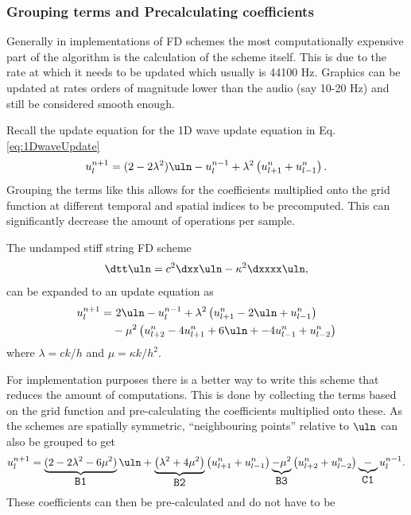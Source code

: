 \pagebreak
\subsubsection{Grouping terms and Precalculating coefficients}
Generally in implementations of FD schemes the most computationally expensive part of the algorithm is the calculation of the scheme itself. This is due to the rate at which it needs to be updated which usually is 44100 Hz. Graphics can be updated at rates orders of magnitude lower than the audio (say 10-20 Hz) and still be considered smooth enough.

Recall the update equation for the 1D wave update equation in Eq. \eqref{eq:1DwaveUpdate}
\begin{equation*}
    u_l^{n+1} = (2 - 2 \lambda^2) \uln - u_l^{n-1} + \lambda^2\left(u_{l+1}^n + u_{l-1}^n\right).
\end{equation*}
Grouping the terms like this allows for the coefficients multiplied onto the grid function at different temporal and spatial indices to be precomputed. This can significantly decrease the amount of operations per sample.

The undamped stiff string FD scheme%
\begin{equation}
    \dtt \uln = c^2 \dxx \uln - \kappa^2 \dxxxx \uln,
\end{equation}
can be expanded to an update equation as
\begin{equation}
    \begin{aligned}
        u_l^{n+1} = &\ 2\uln - u_l^{n-1} + \lambda^2 \left(u_{l+1}^n - 2\uln + u_{l-1}^n\right)\\
        & - \mu^2 \left(u_{l+2}^n - 4u_{l+1}^n + 6\uln + -4u_{l-1}^n + u_{l-2}^n\right)
    \end{aligned}
\end{equation}
where $\lambda = ck/h$ and $\mu = \kappa k / h^2$.

For implementation purposes there is a better way to write this scheme that reduces the amount of computations. This is done by collecting the terms based on the grid function and pre-calculating the coefficients multiplied onto these. As the schemes are spatially symmetric, ``neighbouring points'' relative to $\uln$ can also be grouped to get
\def\semilarge{\fontsize{11}{11.6}\selectfont}
\begin{equation}
    u_l^{n+1} = \underbrace{(2 - 2\lambda^2 - 6\mu^2)}_{\texttt{\semilarge B1}}\uln  + \underbrace{\left(\lambda^2 + 4\mu^2\right)}_{\texttt{\semilarge B2}}\left(u_{l+1}^n+u_{l-1}^n\right)\underbrace{-\mu^2}_{\texttt{\semilarge B3}} \left(u_{l+2}^n+u_{l-2}^n\right) \underbrace{-}_{\texttt{\semilarge C1}} u_l^{n-1}.
\end{equation}
These coefficients can then be pre-calculated and do not have to be 

